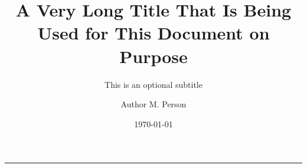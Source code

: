 \documentclass[11pt]{curie}
\title[Title for the Header]{A Very Long Title That Is Being Used for This Document on Purpose}
\subtitle{This is an optional subtitle}
\author{Author M. Person}
\affiliation{Some Affiliation, City}
\date{\today}
\begin{document}
\pagestyle{fancy-first}

\tableofcontents
\clearpage



\begin{center}
\vspace*{0.5em}
\rule{0.8\textwidth}{0.8pt}
\end{center}

\clearpage
\nocite{*}
{\small }

\appendix

\end{document}
